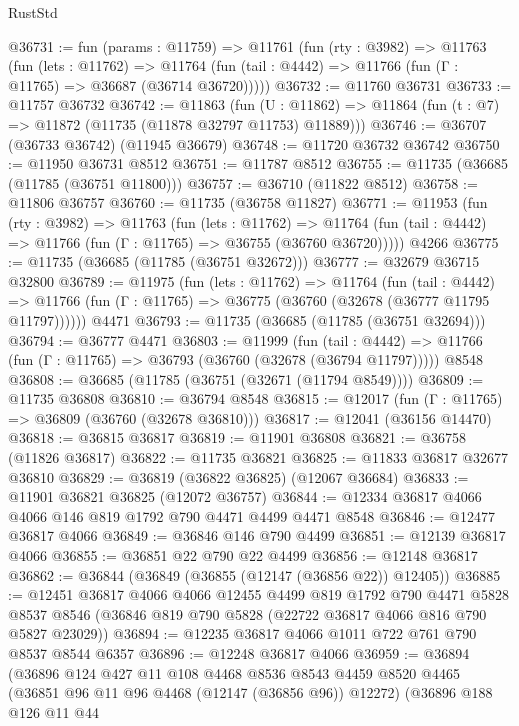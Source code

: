 \begin{lexlean}{RustStd}
\begin{coremodule}
@36731 := fun (params : @11759) =>
  @11761
    (fun (rty : @3982) =>
    @11763
      (fun (lets : @11762) =>
      @11764 (fun (tail : @4442) => @11766 (fun (Γ : @11765) => @36687 (@36714 @36720)))))
@36732 := @11760 @36731
@36733 := @11757 @36732
@36742 := @11863
    (fun (U : @11862) => @11864 (fun (t : @7) => @11872 (@11735 (@11878 @32797 @11753) @11889)))
@36746 := @36707 (@36733 @36742) (@11945 @36679)
@36748 := @11720 @36732 @36742
@36750 := @11950 @36731 @8512
@36751 := @11787 @8512
@36755 := @11735 (@36685 (@11785 (@36751 @11800)))
@36757 := @36710 (@11822 @8512)
@36758 := @11806 @36757
@36760 := @11735 (@36758 @11827)
@36771 := @11953
    (fun (rty : @3982) =>
    @11763
      (fun (lets : @11762) =>
      @11764 (fun (tail : @4442) => @11766 (fun (Γ : @11765) => @36755 (@36760 @36720)))))
    @4266
@36775 := @11735 (@36685 (@11785 (@36751 @32672)))
@36777 := @32679 @36715 @32800
@36789 := @11975
    (fun (lets : @11762) =>
    @11764
      (fun (tail : @4442) =>
      @11766 (fun (Γ : @11765) => @36775 (@36760 (@32678 (@36777 @11795 @11797))))))
    @4471
@36793 := @11735 (@36685 (@11785 (@36751 @32694)))
@36794 := @36777 @4471
@36803 := @11999
    (fun (tail : @4442) => @11766 (fun (Γ : @11765) => @36793 (@36760 (@32678 (@36794 @11797)))))
    @8548
@36808 := @36685 (@11785 (@36751 (@32671 (@11794 @8549))))
@36809 := @11735 @36808
@36810 := @36794 @8548
@36815 := @12017 (fun (Γ : @11765) => @36809 (@36760 (@32678 @36810)))
@36817 := @12041 (@36156 @14470)
@36818 := @36815 @36817
@36819 := @11901 @36808
@36821 := @36758 (@11826 @36817)
@36822 := @11735 @36821
@36825 := @11833 @36817 @32677 @36810
@36829 := @36819 (@36822 @36825) (@12067 @36684)
@36833 := @11901 @36821 @36825 (@12072 @36757)
@36844 := @12334 @36817 @4066 @4066 @146 @819 @1792 @790 @4471 @4499 @4471 @8548
@36846 := @12477 @36817 @4066
@36849 := @36846 @146 @790 @4499
@36851 := @12139 @36817 @4066
@36855 := @36851 @22 @790 @22 @4499
@36856 := @12148 @36817
@36862 := @36844 (@36849 (@36855 (@12147 (@36856 @22)) @12405))
@36885 := @12451
    @36817
    @4066
    @4066
    @12455
    @4499
    @819
    @1792
    @790
    @4471
    @5828
    @8537
    @8546
    (@36846 @819 @790 @5828 (@22722 @36817 @4066 @816 @790 @5827 @23029))
@36894 := @12235 @36817 @4066 @1011 @722 @761 @790 @8537 @8544 @6357
@36896 := @12248 @36817 @4066
@36959 := @36894
    (@36896
      @124
      @427
      @11
      @108
      @4468
      @8536
      @8543
      @4459
      @8520
      @4465
      (@36851 @96 @11 @96 @4468 (@12147 (@36856 @96)) @12272)
      (@36896
        @188
        @126
        @11
        @44

\end{coremodule}
\end{lexlean}
